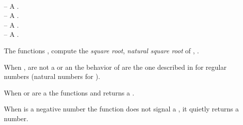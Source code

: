 \documentclass[../Comparisons-Predicates.tex]{subfiles}
\begin{document}

    \DSyntax{}

      \RArrow{} \\
      \RArrow{} 

    \DArgsNValues{}

     -- A .\\
     -- A .\\
     -- A .\\
     -- A .

    \DDescription{}

    The functions ,  compute the \emph{square root},
    \emph{natural square root} of , .

    \noindent
    When ,   are not a  or an
     the behavior of   are the one
    described in \cite{1996:ANSIHyperSpec} for regular numbers (natural
    numbers for ).

    \noindent
    When  or  are a  the functions
     and  returns a .

    \noindent
    When  is a negative 
    number the function  does not signal a
    , it quietly returns a
     number.
\end{document}
